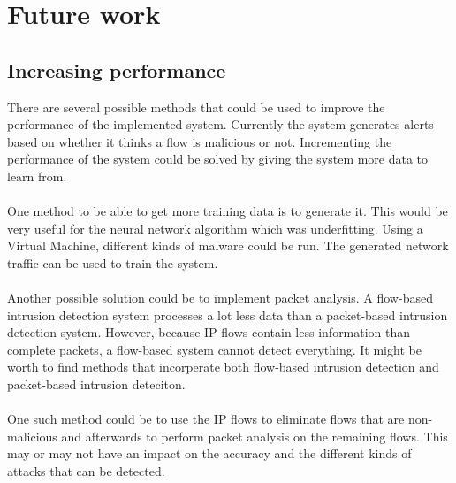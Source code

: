 
\chapter{Future work} %
\label{prevention} %

\section{Increasing performance}
There are several possible methods that could be used to improve the performance of the implemented  system. Currently the system generates alerts based on whether it thinks a flow is malicious or not. Incrementing the performance of the system could be solved by giving the system more data to learn from. \\
\\
One method to be able to get more training data is to generate it. This would be very useful for the neural network algorithm which was underfitting. Using a Virtual Machine, different kinds of malware could be run. The generated network traffic can be used to train the system. \\
\\
Another possible solution could be to implement packet analysis. A flow-based intrusion detection system processes a lot less data than a packet-based intrusion detection system. However, because IP flows contain less information than complete packets, a flow-based system cannot detect everything. It might be worth to find methods that incorperate both flow-based intrusion detection and packet-based intrusion deteciton. \\
\\
One such method could be to use the IP flows to eliminate flows that are non-malicious and afterwards to perform packet analysis on the remaining flows. This may or may not have an impact on the accuracy and the different kinds of attacks that can be detected.

